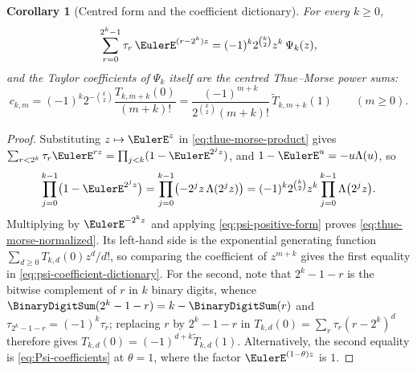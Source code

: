 \documentclass[11pt,a4paper,oneside,openany]{book}
\newtheorem{corollary}[corollary]{Corollary}
\theoremstyle{definition}
\theoremstyle{remark}
\begin{document}
\begin{corollary}[Centred form and the coefficient dictionary]\label{prop:psi-normalization}
For every $k\ge0$,
\begin{equation}\label{eq:thue-morse-normalized}
 \sum_{r=0}^{2^k-1}\tau_r\,\EulerE^{(r-2^k)z}
 =(-1)^k2^{\binom k2}z^k\,\Psi_k(z),
\end{equation}
and the Taylor coefficients of $\Psi_k$ itself are the centred Thue--Morse power sums:
\begin{equation}\label{eq:psi-coefficient-dictionary}
 c_{k,m}
 =(-1)^k2^{-\binom k2}\frac{T_{k,m+k}(0)}{(m+k)!}
 =\frac{(-1)^{m+k}}{2^{\binom k2}(m+k)!}\,\widetilde T_{k,m+k}(1)
 \qquad(m\ge0).
\end{equation}
\end{corollary}

\begin{proof}
Substituting $z\mapsto\EulerE^{z}$ in \eqref{eq:thue-morse-product} gives
$\sum_{r<2^k}\tau_r\EulerE^{rz}=\prod_{j<k}(1-\EulerE^{2^jz})$, and $1-\EulerE^{u}=-u\Lambda(u)$, so
\[
 \prod_{j=0}^{k-1}\bigl(1-\EulerE^{2^jz}\bigr)
 =\prod_{j=0}^{k-1}\bigl(-2^jz\,\Lambda(2^jz)\bigr)
 =(-1)^k2^{\binom k2}z^k\prod_{j=0}^{k-1}\Lambda\bigl(2^jz\bigr).
\]
Multiplying by $\EulerE^{-2^kz}$ and applying \eqref{eq:psi-positive-form} proves
\eqref{eq:thue-morse-normalized}.  Its left-hand side is the exponential generating
function $\sum_{d\ge0}T_{k,d}(0)z^d/d!$, so comparing the coefficient of $z^{m+k}$ gives
the first equality in \eqref{eq:psi-coefficient-dictionary}.  For the second, note that
$2^k-1-r$ is the bitwise complement of $r$ in $k$ binary digits, whence
$\BinaryDigitSum(2^k-1-r)=k-\BinaryDigitSum(r)$ and $\tau_{2^k-1-r}=(-1)^k\tau_r$; replacing $r$ by $2^k-1-r$ in
$T_{k,d}(0)=\sum_r\tau_r(r-2^k)^d$ therefore gives
$T_{k,d}(0)=(-1)^{d+k}\widetilde T_{k,d}(1)$.  Alternatively, the second equality is
\eqref{eq:Psi-coefficients} at $\theta=1$, where the factor $\EulerE^{(1-\theta)z}$ is $1$.
\end{proof}
\end{document}
